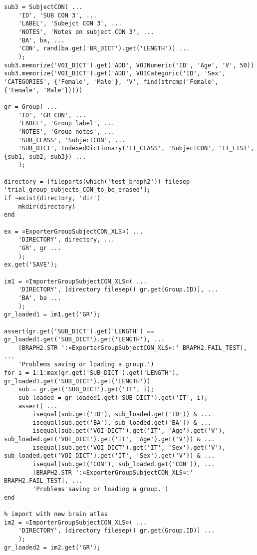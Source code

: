 \documentclass{tufte-handout}
\begin{document}
\begin{lstlisting}
sub3 = SubjectCON( ...
    'ID', 'SUB CON 3', ...
    'LABEL', 'Subejct CON 3', ...
    'NOTES', 'Notes on subject CON 3', ...
    'BA', ba, ...
    'CON', rand(ba.get('BR_DICT').get('LENGTH')) ...
    );
sub3.memorize('VOI_DICT').get('ADD', VOINumeric('ID', 'Age', 'V', 50))
sub3.memorize('VOI_DICT').get('ADD', VOICategoric('ID', 'Sex', 'CATEGORIES', {'Female', 'Male'}, 'V', find(strcmp('Female', {'Female', 'Male'}))))

gr = Group( ...
    'ID', 'GR CON', ...
    'LABEL', 'Group label', ...
    'NOTES', 'Group notes', ...
    'SUB_CLASS', 'SubjectCON', ...
    'SUB_DICT', IndexedDictionary('IT_CLASS', 'SubjectCON', 'IT_LIST', {sub1, sub2, sub3}) ...
    );

directory = [fileparts(which('test_braph2')) filesep 'trial_group_subjects_CON_to_be_erased'];
if ~exist(directory, 'dir')
    mkdir(directory)
end

ex = ¤ExporterGroupSubjectCON_XLS¤( ...
    'DIRECTORY', directory, ...
    'GR', gr ...
    );
ex.get('SAVE');

im1 = ¤ImporterGroupSubjectCON_XLS¤( ...
    'DIRECTORY', [directory filesep() gr.get(Group.ID)], ...
    'BA', ba ...
    );
gr_loaded1 = im1.get('GR');

assert(gr.get('SUB_DICT').get('LENGTH') == gr_loaded1.get('SUB_DICT').get('LENGTH'), ...
	[BRAPH2.STR ':¤ExporterGroupSubjectCON_XLS¤:' BRAPH2.FAIL_TEST], ...
    'Problems saving or loading a group.')
for i = 1:1:max(gr.get('SUB_DICT').get('LENGTH'), gr_loaded1.get('SUB_DICT').get('LENGTH'))
    sub = gr.get('SUB_DICT').get('IT', i);
    sub_loaded = gr_loaded1.get('SUB_DICT').get('IT', i);    
    assert( ...
        isequal(sub.get('ID'), sub_loaded.get('ID')) & ...
        isequal(sub.get('BA'), sub_loaded.get('BA')) & ... 
        isequal(sub.get('VOI_DICT').get('IT', 'Age').get('V'), sub_loaded.get('VOI_DICT').get('IT', 'Age').get('V')) & ... 
        isequal(sub.get('VOI_DICT').get('IT', 'Sex').get('V'), sub_loaded.get('VOI_DICT').get('IT', 'Sex').get('V')) & ...
        isequal(sub.get('CON'), sub_loaded.get('CON')), ...
        [BRAPH2.STR ':¤ExporterGroupSubjectCON_XLS¤:' BRAPH2.FAIL_TEST], ...
        'Problems saving or loading a group.')    
end

% import with new brain atlas
im2 = ¤ImporterGroupSubjectCON_XLS¤( ...
    'DIRECTORY', [directory filesep() gr.get(Group.ID)] ...
    );
gr_loaded2 = im2.get('GR');


\end{lstlisting}
\end{document}
